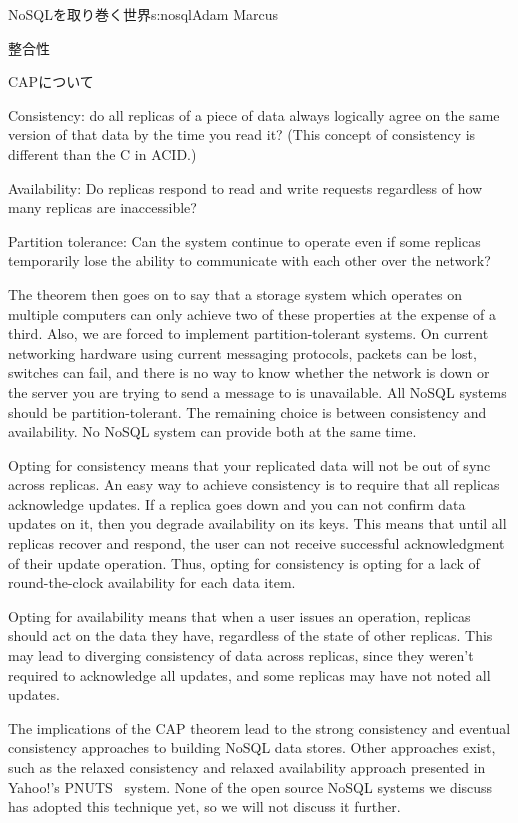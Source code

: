 \begin{aosachapter}{NoSQLを取り巻く世界}{s:nosql}{Adam Marcus}
\begin{aosasect1}{整合性}
\begin{aosasect2}{CAPについて}
\begin{aosadescription}

  \item{Consistency}: do all replicas of a piece of data always
  logically agree on the same version of that data by the time you
  read it?  (This concept of consistency is different than the C in ACID.)

  \item{Availability}: Do replicas respond to read and write requests regardless
  of how many replicas are inaccessible?

  \item{Partition tolerance}: Can the system continue to operate
  even if some replicas temporarily lose the ability to communicate
  with each other over the network?

\end{aosadescription}

The theorem then goes on to say that a storage system which operates on
multiple computers can only achieve two of these properties at the
expense of a third.  Also, we are forced to implement partition-tolerant
systems.  On current networking
hardware using current messaging protocols, packets can be lost,
switches can fail, and there is no way to know whether the network is
down or the server you are trying to send a message to is unavailable.
All NoSQL systems should be partition-tolerant.  The remaining choice
is between consistency and availability.  No NoSQL system can provide
both at the same time.

Opting for consistency means that your replicated data will not be out
of sync across replicas.  An easy way to achieve consistency is to
require that all replicas acknowledge updates.  If a replica goes down
and you can not confirm data updates on it, then you degrade
availability on its keys.  This means that until all replicas recover and respond, the user can not
receive successful acknowledgment of their update operation.  Thus, opting
for consistency is opting for a lack of round-the-clock availability
for each data item.

Opting for availability means that when a user issues an operation,
replicas should act on the
data they have, regardless of the state of other replicas.  This may
lead to diverging consistency of data across replicas, since they
weren't required to acknowledge all updates, and some replicas may
have not noted all updates.

The implications of the CAP theorem lead to the strong consistency and
eventual consistency approaches to building NoSQL data stores.  Other
approaches exist, such as the relaxed consistency and relaxed
availability approach presented in Yahoo!'s PNUTS~\cite{bib:pnuts} system.  None of
the open source NoSQL systems we discuss has adopted this technique yet,
so we will not discuss it further.


\end{aosasect2}
\end{aosasect1}
\end{aosachapter}

